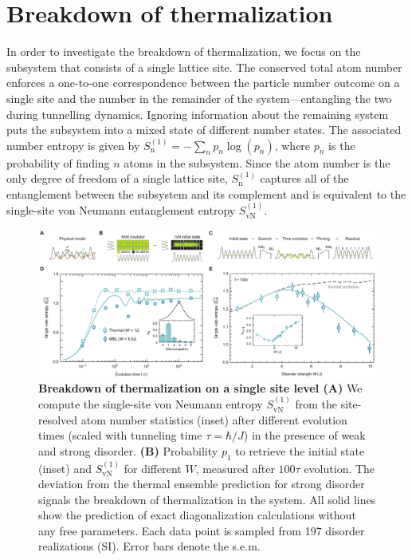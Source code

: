 \section{Breakdown of thermalization}

In order to investigate the breakdown of thermalization, we focus on the subsystem that consists of a single lattice site. The conserved total atom number enforces a one-to-one correspondence between the particle number outcome on a single site and the number in the remainder of the system---entangling the two during tunnelling dynamics. Ignoring information about the remaining system puts the subsystem into a mixed state of different number states. The associated number entropy is given by $S_\text{n}^{(1)} = -\sum_{n} p_n \log(p_n)$, where $p_n$ is the probability of finding $n$ atoms in the subsystem. Since the atom number is the only degree of freedom of a single lattice site, $S_\text{n}^{(1)}$ captures all of the entanglement between the subsystem and its complement and is equivalent to the single-site von Neumann entanglement entropy $S_\text{vN}^{(1)}$.

\begin{figure}[t]
	\centering
	\includegraphics[width=\textwidth]{figures/MBL_ETH_breakdown.pdf}
	{\caption{{\bf Breakdown of thermalization on a single site level (A)} We compute the single-site von Neumann entropy $S_\text{vN}^{(1)}$ from the site-resolved atom number statistics (inset) after different evolution times (scaled with tunneling time $\tau=\hbar/J$) in the presence of weak and strong disorder. {\bf(B)} Probability $p_1$ to retrieve the initial state (inset) and $S_\text{vN}^{(1)}$ for different $W$, measured after $100\tau$ evolution. The deviation from the thermal ensemble prediction for strong disorder signals the breakdown of thermalization in the system. All solid lines show the prediction of exact diagonalization calculations without any free parameters. Each data point is sampled from 197 disorder realizations (SI). Error bars denote the s.e.m.}}
	\label{fig:MBL_ETH_breakdown}
\end{figure}

